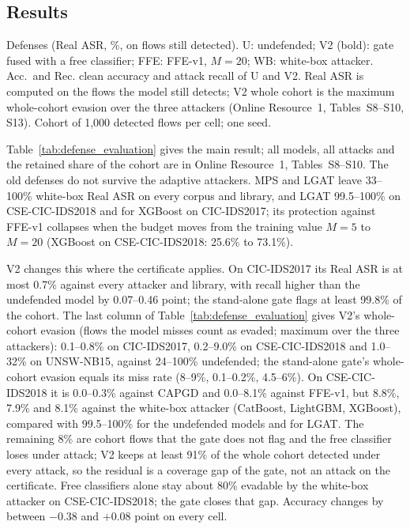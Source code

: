 \subsection{Results}
\label{sec:defense_results}

\begin{table}[!htbp]
\caption{Defenses (Real ASR, \%, on flows still detected). U: undefended; V2 (bold): gate fused with a free classifier; FFE: FFE-v1, $M=20$; WB: white-box attacker. Acc.\ and Rec.\: clean accuracy and attack recall of U and V2. Real ASR is computed on the flows the model still detects; V2 whole cohort is the maximum whole-cohort evasion over the three attackers (Online Resource~1, Tables~S8--S10, S13). Cohort of 1,000 detected flows per cell; one seed.}\label{tab:defense_evaluation}
\centering
\resizebox{\textwidth}{!}{\begin{varwidth}{\maxdimen}\noindent%
%
\end{varwidth}}
\end{table}

Table~\ref{tab:defense_evaluation} gives the main result; all models, all attacks and the retained share of the cohort are in Online Resource~1, Tables~S8--S10. The old defenses do not survive the adaptive attackers. MPS and LGAT leave 33--100\% white-box Real ASR on every corpus and library, and LGAT 99.5--100\% on CSE-CIC-IDS2018 and for XGBoost on CIC-IDS2017; its protection against FFE-v1 collapses when the budget moves from the training value $M=5$ to $M=20$ (XGBoost on CSE-CIC-IDS2018: 25.6\% to 73.1\%).

V2 changes this where the certificate applies. On CIC-IDS2017 its Real ASR is at most 0.7\% against every attacker and library, with recall higher than the undefended model by 0.07--0.46 point; the stand-alone gate flags at least 99.8\% of the cohort. The last column of Table~\ref{tab:defense_evaluation} gives V2's whole-cohort evasion (flows the model misses count as evaded; maximum over the three attackers): 0.1--0.8\% on CIC-IDS2017, 0.2--9.0\% on CSE-CIC-IDS2018 and 1.0--32\% on UNSW-NB15, against 24--100\% undefended; the stand-alone gate's whole-cohort evasion equals its miss rate (8--9\%, 0.1--0.2\%, 4.5--6\%). On CSE-CIC-IDS2018 it is 0.0--0.3\% against CAPGD and 0.0--8.1\% against FFE-v1, but 8.8\%, 7.9\% and 8.1\% against the white-box attacker (CatBoost, LightGBM, XGBoost), compared with 99.5--100\% for the undefended models and for LGAT. The remaining 8\% are cohort flows that the gate does not flag and the free classifier loses under attack; V2 keeps at least 91\% of the whole cohort detected under every attack, so the residual is a coverage gap of the gate, not an attack on the certificate. Free classifiers alone stay about 80\% evadable by the white-box attacker on CSE-CIC-IDS2018; the gate closes that gap. Accuracy changes by between $-0.38$ and $+0.08$ point on every cell.

